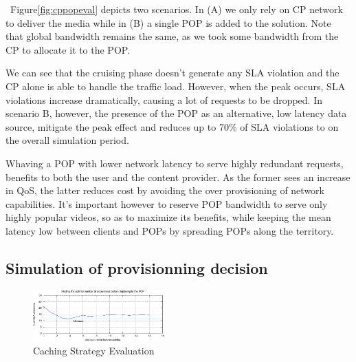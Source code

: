 ~Figure\ref{fig:cppopeval} depicts two scenarios. In (A) we only rely on CP network to deliver the media while in (B) a single POP is added to the solution. Note that global bandwidth remains the same, as we took some bandwidth from the CP to allocate it to the POP.

We can see that the cruising phase doesn't generate any SLA violation and the CP alone is able to handle the traffic load. However, when the peak occurs, SLA violations increase dramatically, causing a lot of requests to be dropped. In scenario B, however, the presence of the POP as an alternative, low latency data source, mitigate the peak effect and reduces up to 70\% of SLA violations to on the overall simulation period.

Whaving a POP with lower network latency to serve highly redundant requests, benefits to both the user and the content provider. As the former sees an increase in QoS, the latter reduces cost by avoiding the over provisioning of network capabilities. It's important however to reserve POP bandwidth to serve only highly popular videos, so as to maximize its benefits, while keeping the mean latency low between clients and POPs by spreading POPs along the territory.




\subsection{Simulation of provisionning decision} \label{provisionningdecisions}

\begin{figure}
	
 \begin{center}
    \includegraphics[width=0.45\textwidth]{fig/cachingStrat_evaluation.pdf}
  \end{center}
  \caption{ Caching Strategy Evaluation
    \label{fig:cachingstrateval}
  }
\end{figure}	

